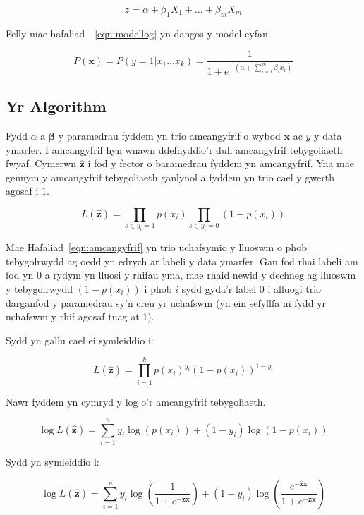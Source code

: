 \begin{equation}\label{eqn:cyfernodau} 
    z = \alpha + \beta_{1}X_{1} + \dots + \beta_{m}X_{m} 
\end{equation} 

Felly mae hafaliad~~\ref{eqn:modellog} yn dangos y model cyfan.

\begin{equation}\label{eqn:modellog}
    P(\mathbf{x}) = P(y = 1 | x_1 \dots x_k) = \frac{1}{1+e^{-( \alpha + \sum_{i=1}^{m} \beta_{i}x_{i})}} 
\end{equation}

\subsection{Yr Algorithm}
\cite{Logistic-regression}
Fydd $\alpha$ a $\mathbf{\beta}$ y paramedrau fyddem yn trio amcangyfrif o wybod $\mathbf{x}$ ac $y$ y data ymarfer. I amcangyfrif hyn wnawn ddefnyddio'r dull amcangyfrif tebygoliaeth fwyaf. Cymerwn $\hat{\mathbf{z}}$ i fod y fector o baramedrau fyddem yn amcangyfrif. Yna mae gennym y amcangyfrif tebygoliaeth ganlynol a fyddem yn trio cael y gwerth agosaf i $1$. 

\begin{equation}\label{eqn:amcangyfrif}
L(\hat{\mathbf{z}}) = \prod_{s \in y_{i}=1} p(x_i) \prod_{s \in y_{i}=0} (1 - p(x_i))
\end{equation}

Mae Hafaliad~\ref{eqn:amcangyfrif} yn trio uchafsymio y lluoswm o phob tebygolrwydd ag oedd yn edrych ar labeli y data ymarfer. Gan fod rhai labeli am fod yn $0$ a rydym yn lluosi y rhifau yma, mae rhaid newid y dechneg ag lluoswm y tebygolrwydd $(1 - p(x_i))$ i phob $i$ sydd gyda'r label $0$ i alluogi trio darganfod y paramedrau sy'n creu yr uchafswm (yn ein sefyllfa ni fydd yr uchafswm y rhif agosaf tuag at $1$). 

Sydd yn gallu cael ei symleiddio i:

$$ L(\hat{\mathbf{z}}) = \prod_{i=1}^{k} p(x_i)^{y_i} (1 - p(x_i))^{1-y_i} $$

Nawr fyddem yn cymryd y log o'r amcangyfrif tebygoliaeth.

$$ \log L(\hat{\mathbf{z}}) = \sum_{i=1}^{n} y_{i} \log(p(x_{i})) + (1-y_{i}) \log(1-p(x_{i})) $$

Sydd yn symleiddio i:

$$ \log L(\hat{\mathbf{z}}) = \sum_{i=1}^{n} y_{i} \log \left(\frac{1}{1 + e^{-\hat{\mathbf{z}}\mathbf{x}}} \right) + (1 - y_i) \log \left(\frac{e^{-\hat{\mathbf{z}}\mathbf{x}}}{1 + e^{-\hat{\mathbf{z}}\mathbf{x}}} \right) $$

